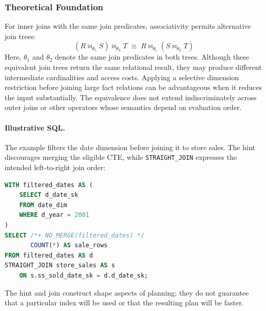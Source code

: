\documentclass{ULBreport}
\begin{document}
\subsubsection{Theoretical Foundation}
For inner joins with the same join predicates, associativity permits alternative join trees:
\begin{equation}
(R \bowtie_{\theta_1} S) \bowtie_{\theta_2} T
\;\equiv\;
R \bowtie_{\theta_1} (S \bowtie_{\theta_2} T)
\end{equation}
Here, $\theta_1$ and $\theta_2$ denote the same join predicates in both trees. Although these equivalent join trees return the same relational result, they may produce different intermediate cardinalities and access costs. Applying a selective dimension restriction before joining large fact relations can be advantageous when it reduces the input substantially. The equivalence does not extend indiscriminately across outer joins or other operators whose semantics depend on evaluation order.

\paragraph{Illustrative SQL.}
The example filters the date dimension before joining it to store sales. The hint discourages merging the eligible CTE, while \texttt{STRAIGHT\_JOIN} expresses the intended left-to-right join order:
\begin{lstlisting}[language=SQL, basicstyle=\ttfamily\scriptsize, breaklines=true, frame=single]
WITH filtered_dates AS (
    SELECT d_date_sk
    FROM date_dim
    WHERE d_year = 2001
)
SELECT /*+ NO_MERGE(filtered_dates) */
       COUNT(*) AS sale_rows
FROM filtered_dates AS d
STRAIGHT_JOIN store_sales AS s
    ON s.ss_sold_date_sk = d.d_date_sk;
\end{lstlisting}
The hint and join construct shape aspects of planning; they do not guarantee that a particular index will be used or that the resulting plan will be faster.
\end{document}
